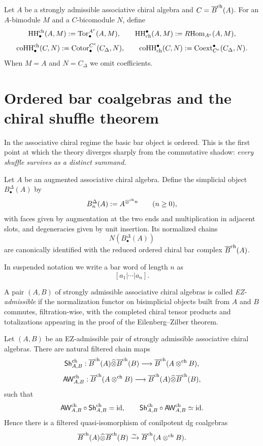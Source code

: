 \begin{definition}
Let $A$ be a strongly admissible associative chiral algebra and $C=\overline{B}^{\mathrm{ch}}(A)$.
For an $A$-bimodule $M$ and a $C$-bicomodule $N$, define
\[
\operatorname{HH}^{\mathrm{ch}}_\bullet(A,M):=\operatorname{Tor}_\bullet^{A^e}(A,M),
\qquad
\operatorname{HH}_{\mathrm{ch}}^\bullet(A,M):=R\!\operatorname{Hom}_{A^e}(A,M),
\]
\[
\operatorname{coHH}^{\mathrm{ch}}_\bullet(C,N):=\operatorname{Cotor}_\bullet^{C^e}(C_\Delta,N),
\qquad
\operatorname{coHH}_{\mathrm{ch}}^\bullet(C,N):=\operatorname{Coext}_{C^e}^\bullet(C_\Delta,N).
\]
When $M=A$ and $N=C_\Delta$ we omit coefficients.
\end{definition}

\section{Ordered bar coalgebras and the chiral shuffle theorem}

In the associative chiral regime the basic bar object is ordered. This is the first point at which
the theory diverges sharply from the commutative shadow: \emph{every shuffle survives as a distinct
summand.}

\begin{definition}
Let $A$ be an augmented associative chiral algebra. Define the simplicial object
$B^\Delta_\bullet(A)$ by
\[
B^\Delta_n(A):=A^{\mathbin{\otimes^{\mathrm{ch}}} n}\qquad (n\geq 0),
\]
with faces given by augmentation at the two ends and multiplication in adjacent slots, and
degeneracies given by unit insertion. Its normalized chains
\[
N(B^\Delta_\bullet(A))
\]
are canonically identified with the reduced ordered chiral bar complex $\overline{B}^{\mathrm{ch}}(A)$.
\end{definition}

In suspended notation we write a bar word of length $n$ as
\[
[a_1|\cdots|a_n].
\]

\begin{definition}
A pair $(A,B)$ of strongly admissible associative chiral algebras is called \emph{EZ-admissible} if
the normalization functor on bisimplicial objects built from $A$ and $B$ commutes, filtration-wise,
with the completed chiral tensor products and totalizations appearing in the proof of the
Eilenberg--Zilber theorem.
\end{definition}

\begin{theorem}
Let $(A,B)$ be an EZ-admissible pair of strongly admissible associative chiral algebras.
There are natural filtered chain maps
\[
\mathsf{Sh}^{\mathrm{ch}}_{A,B}:
\overline{B}^{\mathrm{ch}}(A)\widehat\otimes \overline{B}^{\mathrm{ch}}(B)\longrightarrow \overline{B}^{\mathrm{ch}}(A\mathbin{\otimes^{\mathrm{ch}}} B),
\]
\[
\mathsf{AW}^{\mathrm{ch}}_{A,B}:
\overline{B}^{\mathrm{ch}}(A\mathbin{\otimes^{\mathrm{ch}}} B)\longrightarrow \overline{B}^{\mathrm{ch}}(A)\widehat\otimes \overline{B}^{\mathrm{ch}}(B),
\]
such that
\[
\mathsf{AW}^{\mathrm{ch}}_{A,B}\circ \mathsf{Sh}^{\mathrm{ch}}_{A,B}=\mathrm{id},
\qquad
\mathsf{Sh}^{\mathrm{ch}}_{A,B}\circ \mathsf{AW}^{\mathrm{ch}}_{A,B}\simeq \mathrm{id}.
\]
Hence there is a filtered quasi-isomorphism of conilpotent dg coalgebras
\[
\overline{B}^{\mathrm{ch}}(A)\widehat\otimes \overline{B}^{\mathrm{ch}}(B)\xrightarrow{\sim}\overline{B}^{\mathrm{ch}}(A\mathbin{\otimes^{\mathrm{ch}}} B).
\]
\end{theorem}

